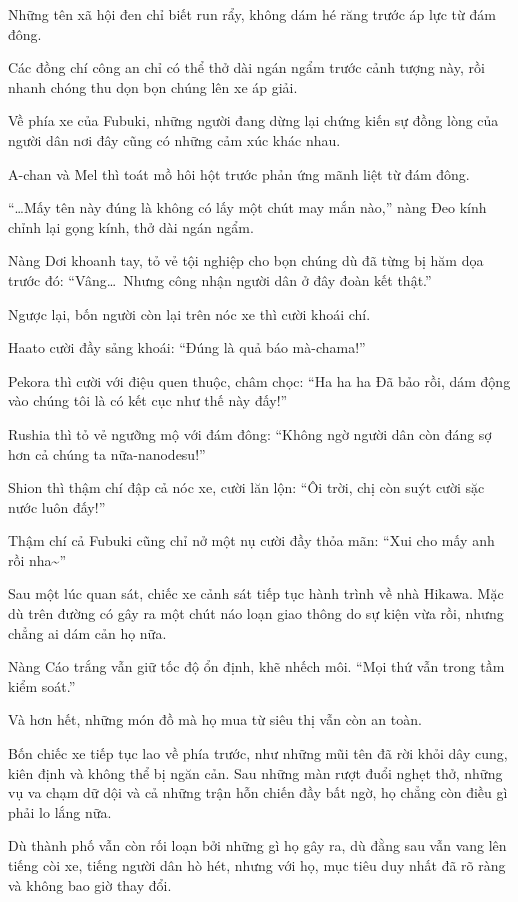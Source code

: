 \documentclass[../main.tex]{subfiles}
\begin{document}
Những tên xã hội đen chỉ biết run rẩy, không dám hé răng trước áp lực từ đám đông.

Các đồng chí công an chỉ có thể thở dài ngán ngẩm trước cảnh tượng này, rồi nhanh chóng thu dọn bọn chúng lên xe áp giải.

Về phía xe của Fubuki, những người đang dừng lại chứng kiến sự đồng lòng của người dân nơi đây cũng có những cảm xúc khác nhau.

A-chan và Mel thì toát mồ hôi hột trước phản ứng mãnh liệt từ đám đông.

``\dots Mấy tên này đúng là không có lấy một chút may mắn nào,'' nàng Đeo kính chỉnh lại gọng kính, thở dài ngán ngẩm.

Nàng Dơi khoanh tay, tỏ vẻ tội nghiệp cho bọn chúng dù đã từng bị hăm dọa trước đó: ``Vâng\dots\ Nhưng công nhận người dân ở đây đoàn kết thật.''

Ngược lại, bốn người còn lại trên nóc xe thì cười khoái chí.

Haato cười đầy sảng khoái: ``Đúng là quả báo mà-chama!''

Pekora thì cười với điệu quen thuộc, châm chọc: ``Ha \uparrow ha \downarrow ha \uparrow Đã bảo rồi, dám động vào chúng tôi là có kết cục như thế này đấy!''

Rushia thì tỏ vẻ ngưỡng mộ với đám đông: ``Không ngờ người dân còn đáng sợ hơn cả chúng ta nữa-nanodesu!''

Shion thì thậm chí đập cả nóc xe, cười lăn lộn: ``Ôi trời, chị còn suýt cười sặc nước luôn đấy!''

Thậm chí cả Fubuki cũng chỉ nở một nụ cười đầy thỏa mãn: ``Xui cho mấy anh rồi nha\~{}''

Sau một lúc quan sát, chiếc xe cảnh sát tiếp tục hành trình về nhà Hikawa. Mặc dù trên đường có gây ra một chút náo loạn giao thông do sự kiện vừa rồi, nhưng chẳng ai dám cản họ nữa.

Nàng Cáo trắng vẫn giữ tốc độ ổn định, khẽ nhếch môi. ``Mọi thứ vẫn trong tầm kiểm soát.''

Và hơn hết, những món đồ mà họ mua từ siêu thị vẫn còn an toàn.

\il

Bốn chiếc xe tiếp tục lao về phía trước, như những mũi tên đã rời khỏi dây cung, kiên định và không thể bị ngăn cản. Sau những màn rượt đuổi nghẹt thở, những vụ va chạm dữ dội và cả những trận hỗn chiến đầy bất ngờ, họ chẳng còn điều gì phải lo lắng nữa.

Dù thành phố vẫn còn rối loạn bởi những gì họ gây ra, dù đằng sau vẫn vang lên tiếng còi xe, tiếng người dân hò hét, nhưng với họ, mục tiêu duy nhất đã rõ ràng và không bao giờ thay đổi.
\end{document}
